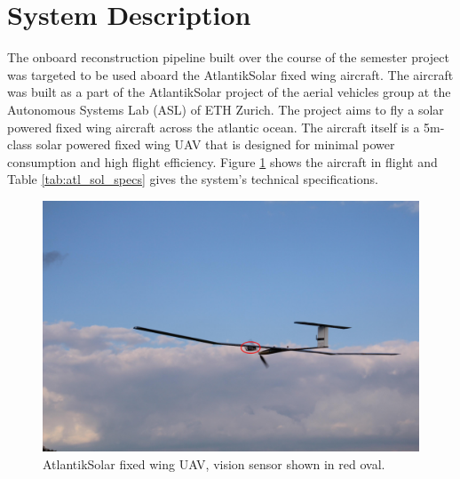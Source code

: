\section{System Description}
\label{sec:intro_sys_description}
The onboard reconstruction pipeline built over the course of the semester project was targeted to be used aboard the AtlantikSolar fixed wing aircraft. The aircraft was built as a part of the AtlantikSolar project\cite{atlanticSolar} of the aerial vehicles group at the Autonomous Systems Lab (ASL) of ETH Zurich. The project aims to fly a solar powered fixed wing aircraft across the atlantic ocean. The aircraft itself is a 5m-class solar powered fixed wing UAV that is designed for minimal power consumption and high flight efficiency. Figure \ref{pic:atlantic_solar_basic} shows the aircraft in flight and Table \ref{tab:atl_sol_specs} gives the system's technical specifications.
\begin{figure}[htp]
\begin{center}
  \includegraphics[width=\textwidth]{images/atlantic_solar}
  \caption{AtlantikSolar fixed wing UAV, vision sensor shown in red oval.}
  \label{pic:atlantic_solar_basic}
\end{center}
\end{figure}

